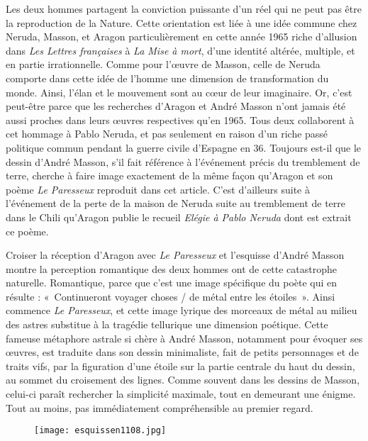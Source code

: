 	Les deux hommes partagent la conviction puissante d’un réel qui ne peut pas être la reproduction de la Nature. Cette orientation est liée à une idée commune chez Neruda, Masson, et Aragon particulièrement en cette année 1965 riche d’allusion dans \emph{Les Lettres françaises} à \emph{La Mise à mort}, d’une identité altérée, multiple, et en partie irrationnelle. Comme pour l’\oe{}uvre de Masson, celle de Neruda comporte dans cette idée de l’homme une dimension de transformation du monde. Ainsi, l’élan et le mouvement sont au c\oe{}ur de leur imaginaire. Or, c’est peut-être parce que les recherches d’Aragon et André Masson n’ont jamais été aussi proches dans leurs \oe{}uvres respectives qu’en 1965. Tous deux collaborent à cet hommage à Pablo Neruda, et pas seulement en raison d'un riche passé politique commun pendant la guerre civile d’Espagne en 36.  Toujours est-il que le dessin d’André Masson, s’il fait référence à l’événement précis du tremblement de terre, cherche à faire image exactement de la même façon qu’Aragon et son poème \emph{Le Paresseux} reproduit dans cet article. C’est d’ailleurs suite à l’événement de la perte de la maison de Neruda suite au tremblement de terre dans le Chili qu’Aragon publie le recueil \emph{Elégie à Pablo Neruda} dont est extrait ce poème. 

Croiser la réception d’Aragon avec \emph{Le Paresseux} et l’esquisse d’André Masson montre la perception romantique des deux hommes ont de cette catastrophe naturelle. Romantique, parce que c’est une image spécifique du poète qui en résulte : « Continueront voyager choses / de métal entre les étoiles ». Ainsi commence \emph{Le Paresseux}, et cette image lyrique des morceaux de métal au milieu des astres substitue à la tragédie tellurique une dimension poétique. Cette fameuse métaphore astrale si chère à André Masson, notamment pour évoquer ses \oe{}uvres, est traduite dans son dessin minimaliste, fait de petits personnages et de traits vifs, par la figuration d’une étoile sur la partie centrale du haut du dessin, au sommet du croisement des lignes. Comme souvent dans les dessins de Masson, celui-ci paraît rechercher la simplicité maximale, tout en demeurant une énigme. Tout au moins, pas immédiatement compréhensible au premier regard. 

\begin{figure}[H]
   \centering
   \texttt{[image: esquissen1108.jpg]}
	\caption{\cite{pabloneruda}}\label{fig:MassonNeruda}
\end{figure}

